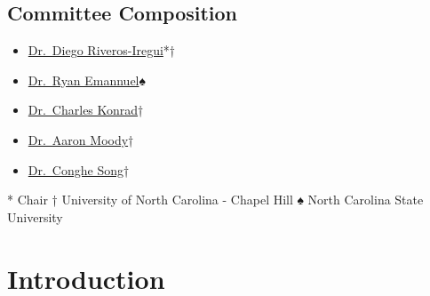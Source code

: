 \documentclass[
]{book}
\providecommand{\tightlist}{%
  \setlength{\itemsep}{0pt}\setlength{\parskip}{0pt}}
\begin{document}
\hypertarget{committee-composition}{%
\section{Committee Composition}\label{committee-composition}}

\begin{itemize}
\tightlist
\item
  \href{http://diegori.web.unc.edu/}{Dr.~Diego Riveros-Iregui}*†
\item
  \href{https://waterpotential.wordpress.ncsu.edu/}{Dr.~Ryan Emannuel}♠
\item
  \href{http://cekd.web.unc.edu/}{Dr.~Charles Konrad}†
\item
  \href{http://aaron.web.unc.edu/}{Dr.~Aaron Moody}†
\item
  \href{http://csong.web.unc.edu/}{Dr.~Conghe Song}†
\end{itemize}

* Chair
† University of North Carolina - Chapel Hill
♠ North Carolina State University

\hypertarget{intro}{%
\chapter{Introduction}\label{intro}}
\end{document}
